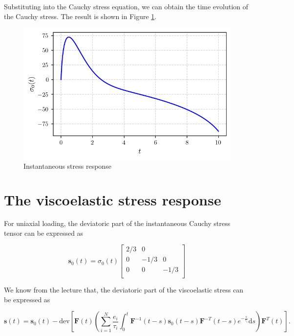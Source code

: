\documentclass[12pt,a4paper]{article}
\begin{document}
Substituting into the Cauchy stress equation, we can obtain the time evolution of the Cauchy stress. The result is shown in Figure \ref{fig:instantaneous_stress}.
\begin{figure}[H]
    \centering
    \includegraphics[scale=0.8]{figures/elastic_solution.png}
    \caption{Instantaneous stress response}
 \label{fig:instantaneous_stress}
\end{figure}

\newpage

\section{The viscoelastic stress response}

For uniaxial loading, the deviatoric part of the instantaneous Cauchy stress tensor can be expressed as

\begin{equation}
    \boldsymbol{s}_0(t) = 
    \sigma_0(t)
    \begin{bmatrix}
        2/3 & 0 & \\
        0 & -1/3 & 0\\
        0 & 0 & -1/3\\
    \end{bmatrix}
\end{equation}


We know from the lecture that, the deviatoric part of the viscoelastic stress can be expressed as

\begin{equation}
\boldsymbol{s}(t) = \boldsymbol{s}_0(t) - 
\text{dev}\left[
    \boldsymbol{F}(t)
        \left(
            \sum_{i=1}^N \frac{e_i}{\tau_i} \int_0^t \boldsymbol{F}^{-1}(t-s) \boldsymbol{s}_0(t-s) \boldsymbol{F}^{-T}(t-s)e^{-\frac{s}{\tau_i}}\text{d}s
        \right)
    \boldsymbol{F}^T(t)
\right].
\end{equation}
\end{document}
